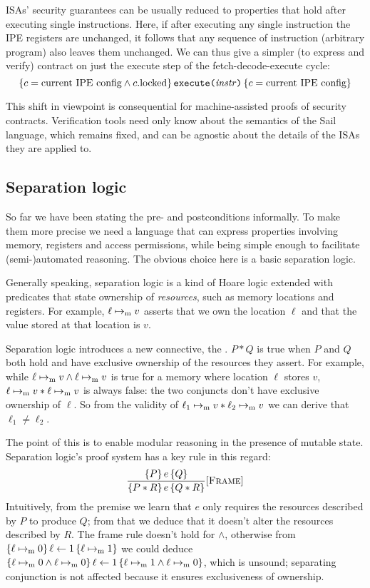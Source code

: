 ISAs' security guarantees can be usually reduced to properties that hold after executing single instructions. Here, if after executing any single instruction the IPE registers are unchanged, it follows that any sequence of instruction (\ie arbitrary program) also leaves them unchanged. We can thus give a simpler (to express and verify) contract on just the execute step of the fetch-decode-execute cycle:
\[ \hoare
  {c = \text{current IPE config} \wedge c.\mathrm{locked}}
  {\texttt{execute(\(\mathit{instr}\))}}
  {c = \text{current IPE config}} \]

This shift in viewpoint is consequential for machine-assisted proofs of security contracts. Verification tools need only know about the semantics of the Sail language, which remains fixed, and can be agnostic about the details of the ISAs they are applied to.

\subsection{Separation logic}

So far we have been stating the pre- and postconditions informally. To make them more precise we need a language that can express properties involving memory, registers and access permissions, while being simple enough to facilitate (semi-)automated reasoning. The obvious choice here is a basic separation logic.

Generally speaking, separation logic is a kind of Hoare logic extended with predicates that state ownership of \emph{resources}, such as memory locations and registers. For example, \(\ell \mapsto_{\mathrm{m}} v\) asserts that we own the location \(\ell\) and that the value stored at that location is \(v\).

Separation logic introduces a new connective, the . \(P \ast Q\) is true when \(P\) and \(Q\) both hold and have exclusive ownership of the resources they assert. For example, while \(\ell \mapsto_{\mathrm{m}} v \wedge \ell \mapsto_{\mathrm{m}} v\) is true for a memory where location \(\ell\) stores \(v\), \(\ell \mapsto_{\mathrm{m}} v \ast \ell \mapsto_{\mathrm{m}} v\) is always false: the two conjuncts don't have exclusive ownership of \(\ell\). So from the validity of \(\ell_1 \mapsto_{\mathrm{m}} v \ast \ell_2 \mapsto_{\mathrm{m}} v\) we can derive that \(\ell_1 \neq \ell_2\).

The point of this is to enable modular reasoning in the presence of mutable state. Separation logic's proof system has a key rule in this regard:
\[ \frac{\hoare{P}{e}{Q}}{\hoare{P \ast R}{e}{Q \ast R}}[\textsc{Frame}] \]
Intuitively, from the premise we learn that \(e\) only requires the resources described by \(P\) to produce \(Q\); from that we deduce that it doesn't alter the resources described by \(R\). The frame rule doesn't hold for \(\wedge\), otherwise from \(\hoare{\ell \ptom 0}{\ell \leftarrow 1}{\ell \ptom 1}\) we could deduce \(\hoare{\ell \ptom 0 \wedge \ell \ptom 0}{\ell \leftarrow 1}{\ell \ptom 1 \wedge \ell \ptom 0}\), which is unsound; separating conjunction is not affected because it ensures exclusiveness of ownership.

